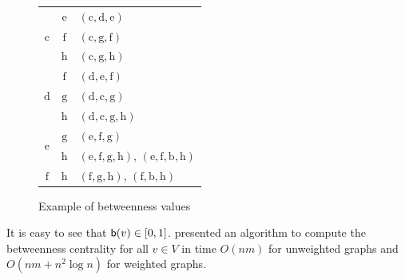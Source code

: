 \begin{figure}[ht]
{\begin{tabular}{ccl}
   \midrule
   \multirow{3}{*}{$\mathrm{c}$} & $\mathrm{e}$ & $(\mathrm{c,d,e})$ \\
   & $\mathrm{f}$ & $(\mathrm{c,g,f})$ \\
   & $\mathrm{h}$ & $(\mathrm{c,g,h})$ \\
   \midrule
   \multirow{3}{*}{$\mathrm{d}$} & $\mathrm{f}$ & $(\mathrm{d,e,f})$ \\
   & $\mathrm{g}$ & $(\mathrm{d,c,g})$ \\
   & $\mathrm{h}$ & $(\mathrm{d,c,g,h})$ \\
   \midrule
   \multirow{2}{*}{$\mathrm{e}$} & $\mathrm{g}$ & $(\mathrm{e,f,g})$ \\
   & $\mathrm{h}$ & $(\mathrm{e,f,g,h})$, $(\mathrm{e,f,b,h})$ \\
   \midrule
   $\mathrm{f}$ & $\mathrm{h}$ & $(\mathrm{f,g,h})$, $(\mathrm{f,b,h})$ \\
   \bottomrule
 \end{tabular}
 }
 \qquad
  \caption{Example of betweenness values}
  \label{fig:centrsamplexample-betw}
\end{figure}
\fi

It is easy to see that $\mathsf{b}(v)\in[0,1]$. \citet{Brandes01} presented an
algorithm to compute the betweenness centrality for all $v\in V$ in time
$O(nm)$ for unweighted graphs and $O(nm + n^2 \log n)$ for weighted graphs. 

